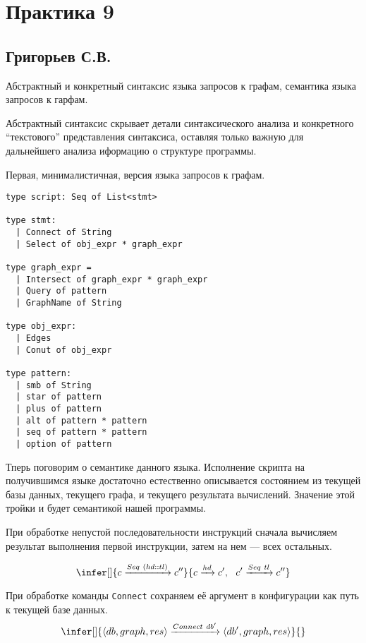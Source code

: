\section{Практика 9}

\subsection{Григорьев С.В.}

Абстрактный и конкретный синтаксис языка запросов к графам, семантика языка запросов к гарфам.

Абстрактный синтаксис скрывает детали синтаксического анализа и конкретного ``текстового'' представления синтаксиса, оставляя только важную для дальнейшего анализа иформацию о структуре программы. 

Первая, минималистичная, версия языка запросов к графам.

\begin{verbatim}
type script: Seq of List<stmt>

type stmt:
  | Connect of String
  | Select of obj_expr * graph_expr

type graph_expr =
  | Intersect of graph_expr * graph_expr 
  | Query of pattern
  | GraphName of String

type obj_expr:
  | Edges   
  | Conut of obj_expr
  
type pattern: 
  | smb of String
  | star of pattern
  | plus of pattern
  | alt of pattern * pattern
  | seq of pattern * pattern
  | option of pattern

\end{verbatim}

\newcommand{\sem}[1]{\llbracket #1 \rrbracket}

Тперь поговорим о семантике данного языка. Исполнение скрипта на получившимся языке достаточно естественно описывается состоянием из текущей базы данных, текущего графа, и текущего результата вычислений. Значение этой тройки и будет семантикой нашей программы.

При обработке непустой последовательности инструкций сначала вычисляем результат выполнения первой инструкции, затем на нем --- всех остальных.

$$
\infer[]{c \xrightarrow{Seq \ (hd::tl)} c''}{c \xrightarrow{hd} c', \ \ c' \xrightarrow{Seq \ tl} c''}
$$

При обработке команды \verb|Connect| сохраняем её аргумент в конфигурации как путь к текущей базе данных.
$$
\infer[]{\langle db, graph, res\rangle \xrightarrow{Connect \ db'} \langle db', graph, res\rangle}{}
$$

